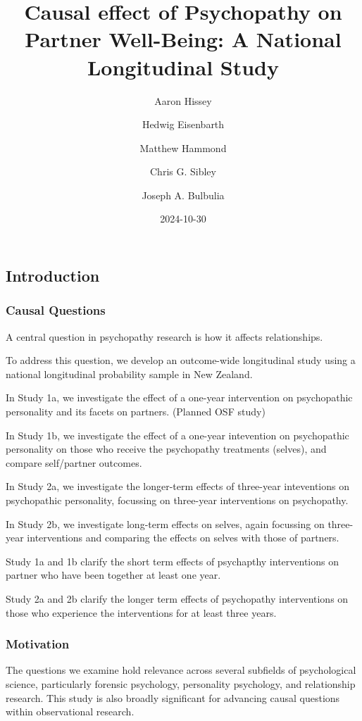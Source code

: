 \documentclass[
  singlecolumn]{article}
\title{Causal effect of Psychopathy on Partner Well-Being: A National
Longitudinal Study}
\author{Aaron Hissey \and Hedwig Eisenbarth \and Matthew
Hammond \and Chris G. Sibley \and Joseph A. Bulbulia}
\date{2024-10-30}
\begin{document}
\maketitle


\subsection{Introduction}\label{introduction}

\subsubsection{Causal Questions}\label{causal-questions}

A central question in psychopathy research is how it affects
relationships.

To address this question, we develop an outcome-wide longitudinal study
using a national longitudinal probability sample in New Zealand.

In Study 1a, we investigate the effect of a one-year intervention on
psychopathic personality and its facets on partners. (Planned OSF study)

In Study 1b, we investigate the effect of a one-year intevention on
psychopathic personality on those who receive the psychopathy treatments
(selves), and compare self/partner outcomes.

In Study 2a, we investigate the longer-term effects of three-year
inteventions on psychopathic personality, focussing on three-year
interventions on psychopathy.

In Study 2b, we investigate long-term effects on selves, again focussing
on three-year interventions and comparing the effects on selves with
those of partners.

Study 1a and 1b clarify the short term effects of psychapthy
interventions on partner who have been together at least one year.

Study 2a and 2b clarify the longer term effects of psychopathy
interventions on those who experience the interventions for at least
three years.

\subsubsection{Motivation}\label{motivation}

The questions we examine hold relevance across several subfields of
psychological science, particularly forensic psychology, personality
psychology, and relationship research. This study is also broadly
significant for advancing causal questions within observational
research.
\end{document}
